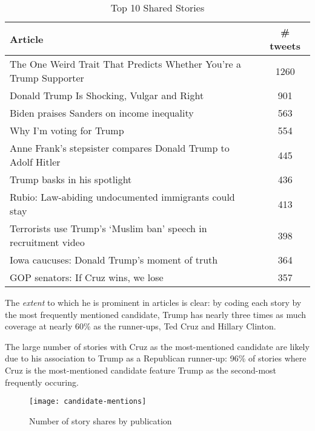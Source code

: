  
\begin{table}
\begin{tabular}{ |l c| } 
    \hline
    Article &  \# tweets \\
    \hline
    The One Weird Trait That Predicts Whether You're a Trump Supporter &   1260 \\
    Donald Trump Is Shocking, Vulgar and Right                         &    901 \\
    Biden praises Sanders on income inequality                         &    563 \\
    Why I'm voting for Trump                                           &    554 \\
    Anne Frank's stepsister compares Donald Trump to Adolf Hitler      &    445 \\
    Trump basks in his spotlight                                       &    436 \\
    Rubio: Law-abiding undocumented immigrants could stay              &    413 \\
    Terrorists use Trump's `Muslim ban' speech in recruitment video    &    398 \\
    Iowa caucuses: Donald Trump's moment of truth                      &    364 \\
    GOP senators: If Cruz wins, we lose                                &    357 \\
    \hline
\end{tabular}
\caption{\label{tab:top-10}Top 10 Shared Stories}
\end{table}

The \emph{extent} to which he is prominent in articles is clear: by coding each story by the most frequently mentioned candidate, Trump has nearly three times as much coverage at nearly 60\% as the runner-ups, Ted Cruz and Hillary Clinton.

The large number of stories with Cruz as the most-mentioned candidate are likely due to his association to Trump as a Republican runner-up: 96\% of stories where Cruz is the most-mentioned candidate feature Trump as the second-most frequently occuring.

\begin{figure}[H]  
\centering 
  \texttt{[image: candidate-mentions]}  
  \caption{Number of story shares by publication
    \label{fig:tweets-by-pub}}
\end{figure} 





